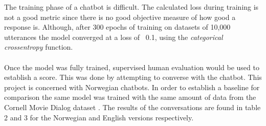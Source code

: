 \documentclass{article}
\begin{document}
The training phase of a chatbot is difficult. The calculated loss during
training is not a good metric since there is no good objective measure of how
good a response is. Although, after 300 epochs of training on datasets of
10,000 utterances the model converged at a loss of ~0.1, using the
\textit{categorical crossentropy} function.

\paragraph{}
Once the model was fully trained, supervised human evaluation would be used to
establish a score. This was done by attempting to converse with the chatbot. 
This project is concerned with Norwegian chatbots. In order to establish a
baseline for comparison the same model was trained with the same amount of data
from the Cornell Movie Dialog dataset \cite{cornell-corpus}. The results of the
conversations are found in table 2 and 3 for the Norwegian and English versions
respectively.
\end{document}
